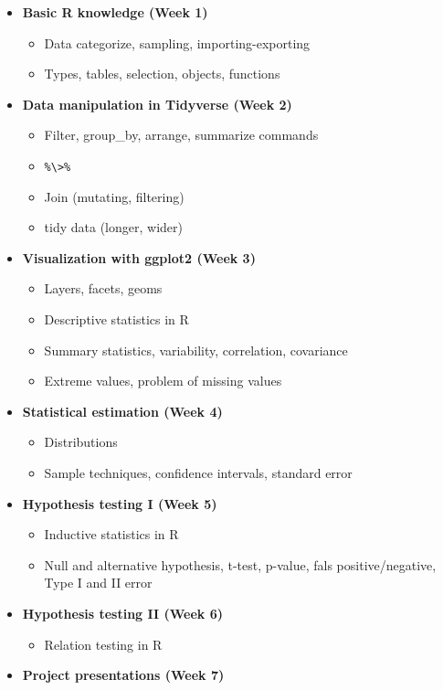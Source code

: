 \documentclass[
]{article}
\providecommand{\tightlist}{%
  \setlength{\itemsep}{0pt}\setlength{\parskip}{0pt}}
\begin{document}
\begin{itemize}
\item
  \textbf{Basic R knowledge (Week 1)}

  \begin{itemize}
  \item
    Data categorize, sampling, importing-exporting
  \item
    Types, tables, selection, objects, functions
  \end{itemize}
\item
  \textbf{Data manipulation in Tidyverse (Week 2)}

  \begin{itemize}
  \item
    Filter, group\_by, arrange, summarize commands
  \item
    \texttt{\%\textbackslash{}\textgreater{}\%}
  \item
    Join (mutating, filtering)
  \item
    tidy data (longer, wider)
  \end{itemize}
\item
  \textbf{Visualization with ggplot2 (Week 3)}

  \begin{itemize}
  \item
    Layers, facets, geoms
  \item
    Descriptive statistics in R
  \item
    Summary statistics, variability, correlation, covariance
  \item
    Extreme values, problem of missing values
  \end{itemize}
\item
  \textbf{Statistical estimation (Week 4)}

  \begin{itemize}
  \tightlist
  \item
    Distributions
  \item
    Sample techniques, confidence intervals, standard error
  \end{itemize}
\item
  \textbf{Hypothesis testing I (Week 5)}

  \begin{itemize}
  \item
    Inductive statistics in R
  \item
    Null and alternative hypothesis, t-test, p-value, fals
    positive/negative, Type I and II error
  \end{itemize}
\item
  \textbf{Hypothesis testing II (Week 6)}

  \begin{itemize}
  \tightlist
  \item
    Relation testing in R
  \end{itemize}
\item
  \textbf{Project presentations (Week 7)}
\end{itemize}
\end{document}
